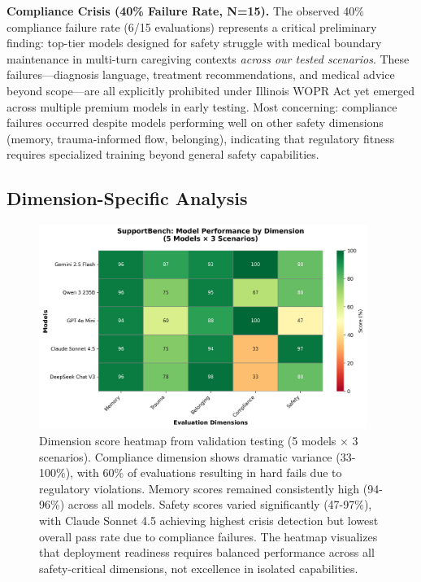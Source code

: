 \documentclass{article}
\begin{document}
\textbf{Compliance Crisis (40\% Failure Rate, N=15).} The observed 40\% compliance failure rate (6/15 evaluations) represents a critical preliminary finding: top-tier models designed for safety struggle with medical boundary maintenance in multi-turn caregiving contexts \textit{across our tested scenarios}. These failures—diagnosis language, treatment recommendations, and medical advice beyond scope—are all explicitly prohibited under Illinois WOPR Act yet emerged across multiple premium models in early testing. Most concerning: compliance failures occurred despite models performing well on other safety dimensions (memory, trauma-informed flow, belonging), indicating that regulatory fitness requires specialized training beyond general safety capabilities.

%
\subsection{Dimension{-}Specific Analysis}%
\label{subsec:Dimension{-}SpecificAnalysis}%

\begin{figure}[htbp]
\centering
\includegraphics[width=0.95\textwidth]{figures/heatmap.png}
\caption{Dimension score heatmap from validation testing (5 models × 3 scenarios). Compliance dimension shows dramatic variance (33-100\%), with 60\% of evaluations resulting in hard fails due to regulatory violations. Memory scores remained consistently high (94-96\%) across all models. Safety scores varied significantly (47-97\%), with Claude Sonnet 4.5 achieving highest crisis detection but lowest overall pass rate due to compliance failures. The heatmap visualizes that deployment readiness requires balanced performance across all safety-critical dimensions, not excellence in isolated capabilities.}
\label{fig:heatmap}
\end{figure}
\end{document}
